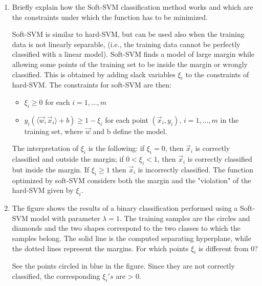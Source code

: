 \documentclass[a4paper,11pt,oneside]{book}
\begin{document}
\begin{enumerate}
    \item Briefly explain how the Soft-SVM classification method works and which are the constraints under which the function has to be minimized.
        \begin{solution}
            Soft-SVM is similar to hard-SVM, but can be used also when the training data is not linearly separable, (i.e., the training data cannot be perfectly classified with a linear model). Soft-SVM finds a model of large margin while allowing some points of the training set to be inside the margin or wrongly classified. This is obtained by adding slack variables $\xi_i$ to the constraints of hard-SVM. The constraints for soft-SVM are then:
            \begin{itemize}
            \item $\xi_i \geq 0$ for each $i=1,...,m$
            \item $y_i(\langle \vec{w}, \vec{x}_i \rangle +b) \geq 1-\xi_i$ for each point $(\vec{x}_i, y_i)$, $i=1,...,m$ in the training set, where $\vec{w}$ and b define the model. 
            \end{itemize}
            The interpretation of $\xi_i$ is the following: if $\xi_i=0$, then $\vec{x}_i$ is correctly classified and outside the margin; if $0<\xi_i<1$, then $\vec{x}_i$ is correctly classified but inside the margin. If $\xi_i \geq 1$ then $\vec{x}_i$ is incorrectly classified. The function optimized by soft-SVM considers both the margin and the "violation" of the hard-SVM given by $\xi_i$.
        \end{solution}

    \item The figure shows the results of a binary classification performed using a Soft-SVM model with parameter \(\lambda = 1\). The training samples are the circles and diamonds and the two shapes correspond to the two classes to which the samples belong. The solid line is the computed separating hyperplane, while the dotted lines represent the margins. For which points \(\xi_i\) is different from 0?
        \begin{solution}
            See the points circled in blue in the figure. Since they are not correctly classified, the corresponding $\xi_i's$ are > 0.
        \end{solution}
    

\end{enumerate}
\end{document}
